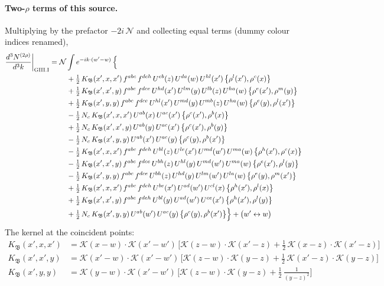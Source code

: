 \documentclass[10pt]{article}
\numberwithin{equation}{section}
\newcommand{\KK}{\mathcal K}
\newcommand{\NN}{\mathcal N}
\begin{document}
\paragraph{Two-$\rho$ terms of this source.} Multiplying by the prefactor $-2i\,\NN$ and collecting equal terms (dummy colour indices renamed),
\begin{align}
\frac{d^3N^{(2\rho)}}{d^3k}\bigg|_{\rm GIII.I}={}&\NN\int e^{-ik\cdot(w'-w)}\,\Big\{\notag\\
&\quad +\tfrac12\,K_{\mathfrak B}(x',x,x')\,f^{abc}\,f^{deh}\,U^{eb}(z)\,U^{da}(w)\,U^{hl}(x')\,\big\{\rho^{l}(x'),\rho^{c}(x)\big\}\notag\\
&\quad +\tfrac12\,K_{\mathfrak B}(x',x',y)\,f^{abc}\,f^{dce}\,U^{hd}(x')\,U^{lm}(y)\,U^{lb}(z)\,U^{ha}(w)\,\big\{\rho^{e}(x'),\rho^{m}(y)\big\}\notag\\
&\quad +\tfrac12\,K_{\mathfrak B}(x',y,y)\,f^{abc}\,f^{dce}\,U^{hl}(x')\,U^{md}(y)\,U^{mb}(z)\,U^{ha}(w)\,\big\{\rho^{e}(y),\rho^{l}(x')\big\}\notag\\
&\quad -\tfrac12\,N_{c}\,K_{\mathfrak B}(x',x,x')\,U^{ab}(x)\,U^{ac}(x')\,\big\{\rho^{c}(x'),\rho^{b}(x)\big\}\notag\\
&\quad +\tfrac12\,N_{c}\,K_{\mathfrak B}(x',x',y)\,U^{ab}(y)\,U^{ac}(x')\,\big\{\rho^{c}(x'),\rho^{b}(y)\big\}\notag\\
&\quad -\tfrac12\,N_{c}\,K_{\mathfrak B}(x',y,y)\,U^{ab}(x')\,U^{ac}(y)\,\big\{\rho^{c}(y),\rho^{b}(x')\big\}\notag\\
&\quad -\tfrac12\,K_{\mathfrak B}(x',x,x')\,f^{abc}\,f^{deh}\,U^{bl}(z)\,U^{le}(x')\,U^{md}(w')\,U^{ma}(w)\,\big\{\rho^{h}(x'),\rho^{c}(x)\big\}\notag\\
&\quad -\tfrac12\,K_{\mathfrak B}(x',x',y)\,f^{abc}\,f^{dce}\,U^{bh}(z)\,U^{hl}(y)\,U^{md}(w')\,U^{ma}(w)\,\big\{\rho^{e}(x'),\rho^{l}(y)\big\}\notag\\
&\quad -\tfrac12\,K_{\mathfrak B}(x',y,y)\,f^{abc}\,f^{dce}\,U^{bh}(z)\,U^{hd}(y)\,U^{lm}(w')\,U^{la}(w)\,\big\{\rho^{e}(y),\rho^{m}(x')\big\}\notag\\
&\quad +\tfrac12\,K_{\mathfrak B}(x',x,x')\,f^{abc}\,f^{deh}\,U^{be}(x')\,U^{ad}(w')\,U^{cl}(x)\,\big\{\rho^{h}(x'),\rho^{l}(x)\big\}\notag\\
&\quad +\tfrac12\,K_{\mathfrak B}(x',x',y)\,f^{abc}\,f^{deh}\,U^{bl}(y)\,U^{ad}(w')\,U^{ce}(x')\,\big\{\rho^{h}(x'),\rho^{l}(y)\big\}\notag\\
&\quad +\tfrac12\,N_{c}\,K_{\mathfrak B}(x',y,y)\,U^{ab}(w')\,U^{ac}(y)\,\big\{\rho^{c}(y),\rho^{b}(x')\big\}\Big\}+\big(w'\leftrightarrow w\big)\label{eq:res-GIII.I}
\end{align}
The kernel at the coincident points:
\begin{align*}
K_{\mathfrak B}(x',x,x')&=\KK(x-w)\cdot\KK(x'-w')\,\Big[\KK(z-w)\cdot\KK(x'-z)+\tfrac12\,\KK(x-z)\cdot\KK(x'-z)\Big]\\K_{\mathfrak B}(x',x',y)&=\KK(x'-w)\cdot\KK(x'-w')\,\Big[\KK(z-w)\cdot\KK(y-z)+\tfrac12\,\KK(x'-z)\cdot\KK(y-z)\Big]\\K_{\mathfrak B}(x',y,y)&=\KK(y-w)\cdot\KK(x'-w')\,\Big[\KK(z-w)\cdot\KK(y-z)+\tfrac12\,\frac{1}{(y-z)^2}\Big]
\end{align*}
\end{document}
